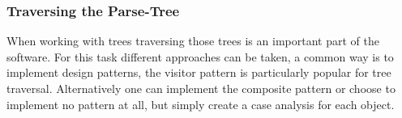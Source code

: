 
\subsubsection*{Traversing the Parse-Tree}
When working with trees traversing those trees is an important part of the software.
For this task different approaches can be taken, a common way is to implement design patterns, the visitor pattern is particularly popular for tree traversal.
Alternatively one can implement the composite pattern or choose to implement no pattern at all, but simply create a case analysis for each object.

